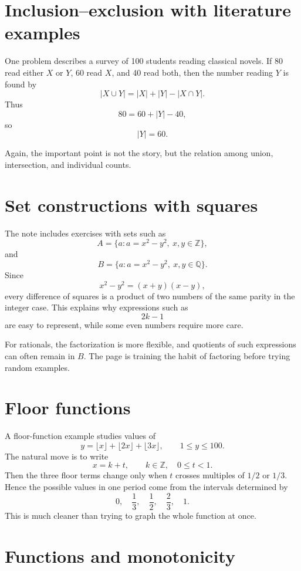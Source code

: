 \section{Inclusion--exclusion with literature examples}

One problem describes a survey of 100 students reading classical novels.  If 80 read either \(X\) or \(Y\), 60 read \(X\), and 40 read both, then the number reading \(Y\) is found by
\[
  |X\cup Y|=|X|+|Y|-|X\cap Y|.
\]
Thus
\[
  80=60+|Y|-40,
\]
so
\[
  |Y|=60.
\]

Again, the important point is not the story, but the relation among union, intersection, and individual counts.

\section{Set constructions with squares}

The note includes exercises with sets such as
\[
  A=\{a:a=x^2-y^2,\ x,y\in\mathbb Z\},
\]
and
\[
  B=\{a:a=x^2-y^2,\ x,y\in\mathbb Q\}.
\]
Since
\[
  x^2-y^2=(x+y)(x-y),
\]
every difference of squares is a product of two numbers of the same parity in the integer case.  This explains why expressions such as
\[
  2k-1
\]
are easy to represent, while some even numbers require more care.

For rationals, the factorization is more flexible, and quotients of such expressions can often remain in \(B\).  The page is training the habit of factoring before trying random examples.

\section{Floor functions}

A floor-function example studies values of
\[
  y=\lfloor x\rfloor+\lfloor 2x\rfloor+\lfloor 3x\rfloor,\qquad 1\le y\le100.
\]
The natural move is to write
\[
  x=k+t,\qquad k\in\mathbb Z,\quad 0\le t<1.
\]
Then the three floor terms change only when \(t\) crosses multiples of \(1/2\) or \(1/3\).  Hence the possible values in one period come from the intervals determined by
\[
  0,\quad \frac13,\quad \frac12,\quad \frac23,\quad 1.
\]
This is much cleaner than trying to graph the whole function at once.

\section{Functions and monotonicity}

